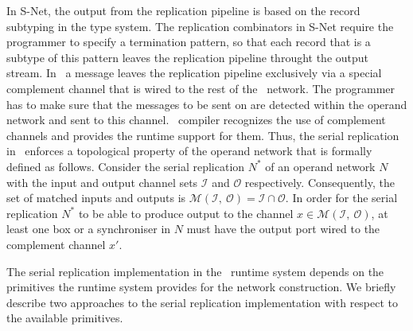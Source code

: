 In S-Net, the output from the replication pipeline is based on the record subtyping in the type system. The replication combinators in S-Net require the programmer to specify a termination pattern, so that each record that is a subtype of this pattern leaves the replication pipeline throught the output stream. In \ak\, a message leaves the replication pipeline exclusively via a special complement channel that is wired to the rest of the \ak\ network. The programmer has to make sure that the messages to be sent on are detected within the operand network and sent to this channel. \ak\ compiler recognizes the use of complement channels and provides the runtime support for them. Thus, the serial replication in \ak\ enforces a topological property of the operand network that is formally defined as follows. Consider the serial replication $N^{*}$ of an operand network $N$ with the input and output channel sets $\mathcal{I}$ and $\mathcal{O}$ respectively. Consequently, the set of matched inputs and outputs is $\mathcal{M}(\mathcal{I}, \: \mathcal{O}) = \mathcal{I} \cap \mathcal{O}$. In order for the serial replication $N^{*}$ to be able to produce output to the channel $x \in \mathcal{M}(\mathcal{I}, \: \mathcal{O})$, at least one box or a synchroniser in $N$ must have the output port wired to the complement channel $x'$.

The serial replication implementation in the \ak\ runtime system depends on the primitives the runtime system provides for the network construction. We briefly describe two approaches to the serial replication implementation with respect to the available primitives.

